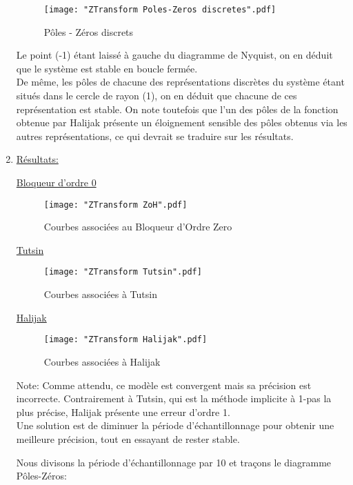 \documentclass[a4paper,12pt,fleqn]{article}
\begin{document}
\begin{enumerate}
\begin{figure}[htb]
  \centering      
    \texttt{[image: "ZTransform Poles-Zeros discretes".pdf]}
	\caption{Pôles - Zéros discrets}
\end{figure}
\FloatBarrier

Le point (-1) étant laissé à gauche du diagramme de Nyquist, on en déduit que le système est stable en boucle fermée.\\
De même, les pôles de chacune des représentations discrètes du système étant situés dans le cercle de rayon (1), on en déduit que chacune de ces représentation est stable.
On note toutefois que l'un des pôles de la fonction obtenue par Halijak présente un éloignement sensible des pôles obtenus via les autres représentations, ce qui devrait se traduire sur les résultats.

\item \underline{Résultats:}

\pagebreak[4]
\underline{Bloqueur d'ordre 0}

\begin{figure}[htb]
  \centering      
    \texttt{[image: "ZTransform ZoH".pdf]}
	\caption{Courbes associées au Bloqueur d'Ordre Zero}
\end{figure}

\pagebreak[4]
\underline{Tutsin}

\begin{figure}[htb]
  \centering      
    \texttt{[image: "ZTransform Tutsin".pdf]}
	\caption{Courbes associées à Tutsin}
\end{figure}

\pagebreak[4]

\pagebreak[4]
\underline{Halijak}

\begin{figure}[htb]
  \centering      
    \texttt{[image: "ZTransform Halijak".pdf]}
	\caption{Courbes associées à Halijak}
\end{figure}

Note: Comme attendu, ce modèle est convergent mais sa précision est incorrecte.
Contrairement à Tutsin, qui est la méthode implicite à 1-pas la plus précise, Halijak présente une erreur d'ordre 1.\\
Une solution est de diminuer la période d'échantillonnage pour obtenir une meilleure précision, tout en essayant de rester stable.

Nous divisons la période d'échantillonnage par 10 et traçons le diagramme Pôles-Zéros:


\end{enumerate}
\end{document}
